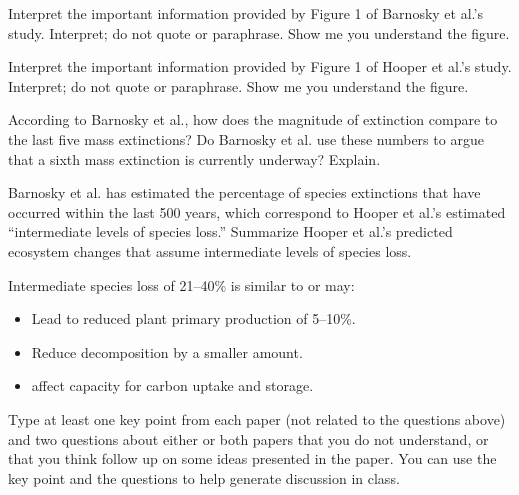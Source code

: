 \documentclass[12pt, addpoints]{exam}
\begin{document}
\begin{questions}

\question[5]
 Interpret the important information provided by Figure 1 of Barnosky et 
  al.'s study. Interpret; do not quote or paraphrase. Show me you
  understand the figure.

\question[5]
Interpret the important information provided by Figure 1 of Hooper et
  al.'s study. Interpret; do not quote or paraphrase. Show me you
  understand the figure.
  

\question[5]
According to Barnosky et al., how does the magnitude of extinction compare to the last five mass extinctions? Do
  Barnosky et al. use these numbers to argue that a sixth mass
  extinction is currently underway? Explain.


\question[10]
Barnosky et al. has estimated the percentage of species extinctions
  that have occurred within the last 500 years, which correspond to
  Hooper et al.'s estimated ``intermediate levels of species loss.''
  Summarize Hooper et al.'s predicted ecosystem changes that assume
  intermediate levels of species loss.

\ifprintanswers\begin{solution}
Intermediate species loss of 21--40\% is similar to or may:

\begin{itemize}
	\item Lead to reduced plant primary production of 5--10\%.

	\item Reduce decomposition by a smaller amount.

	\item affect capacity for carbon uptake and storage.
\end{itemize}
\end{solution}
\else
\fi

\question[5]
Type at least one key point from each paper (not related to the
  questions above) and two questions about either or both papers that
  you do not understand, or that you think follow up on some ideas
  presented in the paper. You can use the key point and the questions to
  help generate discussion in class. 


\end{questions}
\end{document}
